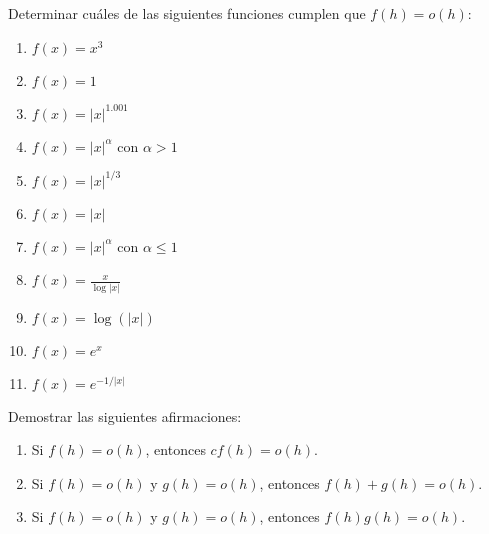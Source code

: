 \item Determinar cuáles de las siguientes funciones cumplen que $f(h)=o(h)$:
\begin{multicols}{2}
\begin{enumerate}
    \item $f(x) = x^3$
    \item $f(x) = 1$
    \item $f(x) = |x|^{1.001}$
    \item $f(x) = |x|^\alpha$ con $\alpha > 1$
    \item $f(x) = |x|^{1/3}$
    \item $f(x) = |x|$
    \item $f(x) = |x|^\alpha$ con $\alpha \le 1$
    \item $f(x) = \frac{x}{\log |x|}$
    \item $f(x) = \log(|x|)$
    \item $f(x) = e^x$
    \item $f(x) = e^{-1/|x|}$
    
\end{enumerate}    
\end{multicols}

\item Demostrar las siguientes afirmaciones:
    \begin{enumerate}
        \item Si $f(h)=o(h)$, entonces $cf(h) = o(h)$.
        \item Si $f(h)=o(h)$ y $g(h) = o(h)$, entonces $f(h)+g(h) = o(h)$.
        \item Si $f(h)=o(h)$ y $g(h) = o(h)$, entonces $f(h)g(h) = o(h)$.
    \end{enumerate}
